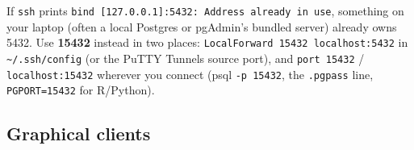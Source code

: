 \documentclass[
  letterpaper,
  DIV=11,
  numbers=noendperiod]{scrreprt}
\begin{document}
\begin{tcolorbox}[enhanced jigsaw, arc=.35mm, colback=white, left=2mm, leftrule=.75mm, titlerule=0mm, bottomrule=.15mm, colbacktitle=quarto-callout-warning-color!10!white, colframe=quarto-callout-warning-color-frame, rightrule=.15mm, title=\textcolor{quarto-callout-warning-color}{\faExclamationTriangle}\hspace{0.5em}{``Address already in use'' / port 5432 taken}, breakable, opacityback=0, toptitle=1mm, toprule=.15mm, coltitle=black, bottomtitle=1mm, opacitybacktitle=0.6]

If \texttt{ssh} prints
\texttt{bind\ {[}127.0.0.1{]}:5432:\ Address\ already\ in\ use},
something on your laptop (often a local Postgres or pgAdmin's bundled
server) already owns 5432. Use \textbf{15432} instead in two places:
\texttt{LocalForward\ 15432\ localhost:5432} in
\texttt{\textasciitilde{}/.ssh/config} (or the PuTTY Tunnels source
port), and \texttt{port\ 15432} / \texttt{localhost:15432} wherever you
connect (psql \texttt{-p\ 15432}, the \texttt{.pgpass} line,
\texttt{PGPORT=15432} for R/Python).

\end{tcolorbox}

\subsection{Graphical clients}\label{graphical-clients}
\end{document}
